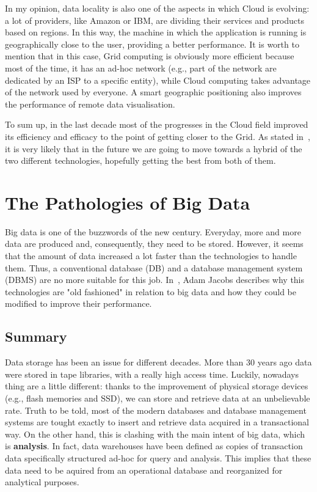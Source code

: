 \documentclass[a4paper]{IEEEtran}
\begin{document}
In my opinion, data locality is also one of the aspects in which Cloud is evolving: a lot of providers, like Amazon or IBM, are dividing their services and products based on regions. In this way, the machine in which the application is running is geographically close to the user, providing a better performance. It is worth to mention that in this case, Grid computing is obviously more efficient because most of the time, it has an ad-hoc network (e.g., part of the network are dedicated by an ISP to a specific entity), while Cloud computing takes advantage of the network used by everyone. A smart geographic positioning also improves the performance of remote data visualisation.

To sum up, in the last decade most of the progresses in the Cloud field improved its efficiency and efficacy to the point of getting closer to the Grid. As stated in~\cite{CloudGrid}, it is very likely that in the future we are going to move towards a hybrid of the two different technologies, hopefully getting the best from both of them. 

\section{The Pathologies of Big Data}

Big data is one of the buzzwords of the new century. Everyday, more and more data are produced and, consequently, they need to be stored. However, it seems that the amount of data increased a lot faster than the technologies to handle them. Thus, a conventional database (DB) and a database management system (DBMS) are no more suitable for this job. In~\cite{BigData}, Adam Jacobs describes why this technologies are "old fashioned" in relation to big data and how they could be modified to improve their performance.

\subsection{Summary}

Data storage has been an issue for different decades. More than 30 years ago data were stored in tape libraries, with a really high access time. Luckily, nowadays thing are a little different: thanks to the improvement of physical storage devices (e.g., flash memories and SSD), we can store and retrieve data at an unbelievable rate. Truth to be told, most of the modern databases and database management systems are tought exactly to insert and retrieve data acquired in a transactional way. On the other hand, this is clashing with the main intent of big data, which is \textbf{analysis}. In fact, data warehouses have been defined as copies of transaction data specifically structured ad-hoc for query and analysis. This implies that these data need to be aquired from an operational database and reorganized for analytical purposes.
\end{document}
